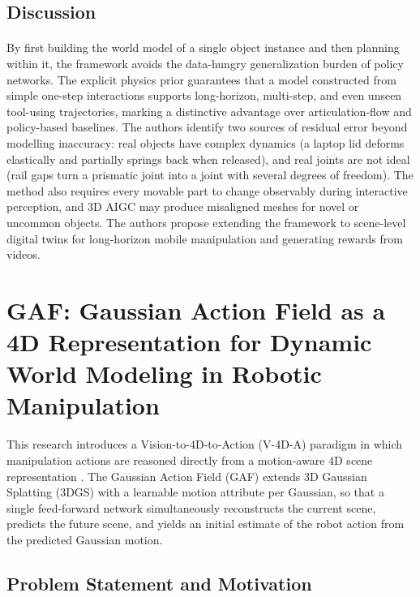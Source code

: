 \documentclass[12pt,a4paper,final]{extreport}
\begin{document}
\subsection{Discussion}

\paragraph{}
By first building the world model of a single object instance and then planning within it, the framework avoids the data-hungry generalization burden of policy networks. The explicit physics prior guarantees that a model constructed from simple one-step interactions supports long-horizon, multi-step, and even unseen tool-using trajectories, marking a distinctive advantage over articulation-flow and policy-based baselines. The authors identify two sources of residual error beyond modelling inaccuracy: real objects have complex dynamics (a laptop lid deforms elastically and partially springs back when released), and real joints are not ideal (rail gaps turn a prismatic joint into a joint with several degrees of freedom). The method also requires every movable part to change observably during interactive perception, and 3D AIGC may produce misaligned meshes for novel or uncommon objects. The authors propose extending the framework to scene-level digital twins for long-horizon mobile manipulation and generating rewards from videos.


\section{GAF: Gaussian Action Field as a 4D Representation for Dynamic World Modeling in Robotic Manipulation}

This research introduces a Vision-to-4D-to-Action (V-4D-A) paradigm in which manipulation actions are reasoned directly from a motion-aware 4D scene representation \cite{p2}. The Gaussian Action Field (GAF) extends 3D Gaussian Splatting (3DGS) with a learnable motion attribute per Gaussian, so that a single feed-forward network simultaneously reconstructs the current scene, predicts the future scene, and yields an initial estimate of the robot action from the predicted Gaussian motion.

\subsection{Problem Statement and Motivation}
\end{document}
